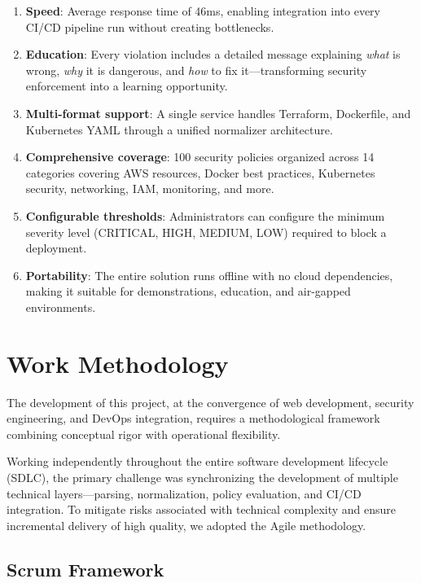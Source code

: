 \begin{enumerate}
    \item \textbf{Speed}: Average response time of 46ms, enabling integration into every CI/CD pipeline run without creating bottlenecks.
    \item \textbf{Education}: Every violation includes a detailed message explaining \textit{what} is wrong, \textit{why} it is dangerous, and \textit{how} to fix it—transforming security enforcement into a learning opportunity.
    \item \textbf{Multi-format support}: A single service handles Terraform, Dockerfile, and Kubernetes YAML through a unified normalizer architecture.
    \item \textbf{Comprehensive coverage}: 100 security policies organized across 14 categories covering AWS resources, Docker best practices, Kubernetes security, networking, IAM, monitoring, and more.
    \item \textbf{Configurable thresholds}: Administrators can configure the minimum severity level (CRITICAL, HIGH, MEDIUM, LOW) required to block a deployment.
    \item \textbf{Portability}: The entire solution runs offline with no cloud dependencies, making it suitable for demonstrations, education, and air-gapped environments.
\end{enumerate}

\section{Work Methodology}

The development of this project, at the convergence of web development, security engineering, and DevOps integration, requires a methodological framework combining conceptual rigor with operational flexibility.

Working independently throughout the entire software development lifecycle (SDLC), the primary challenge was synchronizing the development of multiple technical layers—parsing, normalization, policy evaluation, and CI/CD integration. To mitigate risks associated with technical complexity and ensure incremental delivery of high quality, we adopted the Agile methodology.

\subsection{Scrum Framework}

